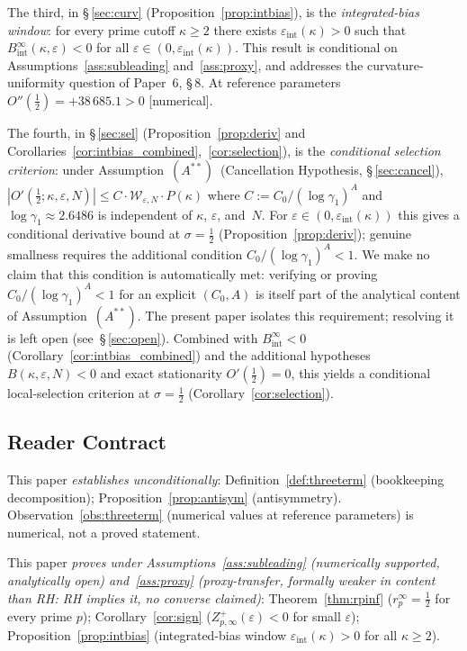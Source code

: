 \documentclass[11pt]{article}
\newcommand{\Wgamma}{\mathcal{W}_{\varepsilon,N}}   %
\newcommand{\Astar}{\ensuremath{(A^{**})}}  %
\begin{document}
The third, in \S\,\ref{sec:curv} (Proposition~\ref{prop:intbias}), is
the \emph{integrated-bias window}: for every prime cutoff $\kappa\ge 2$
there exists $\varepsilon_{\mathrm{int}}(\kappa)>0$ such that
$B_{\mathrm{int}}^\infty(\kappa,\varepsilon)<0$ for all
$\varepsilon\in(0,\varepsilon_{\mathrm{int}}(\kappa))$.
This result is conditional on Assumptions~\ref{ass:subleading}
and~\ref{ass:proxy}, and addresses the curvature-uniformity question
of Paper~6, \S\,8.
At reference parameters $O''(\tfrac12)=+38\,685.1>0$ [numerical].

The fourth, in \S\,\ref{sec:sel} (Proposition~\ref{prop:deriv} and
Corollaries~\ref{cor:intbias_combined},~\ref{cor:selection}), is the
\emph{conditional selection criterion}: under Assumption~\Astar\
(Cancellation Hypothesis, \S\,\ref{sec:cancel}),
$|O'(\tfrac12;\kappa,\varepsilon,N)|\le C\cdot\Wgamma\cdot P(\kappa)$
where $C:=C_0/(\log\gamma_1)^A$
and $\log\gamma_1\approx 2.6486$ is independent of $\kappa$, $\varepsilon$, and~$N$.
For $\varepsilon\in(0,\varepsilon_{\mathrm{int}}(\kappa))$ this gives a
conditional derivative bound at $\sigma=\tfrac12$
(Proposition~\ref{prop:deriv}); genuine smallness
requires the additional condition $C_0/(\log\gamma_1)^A<1$.
We make no claim that this condition is automatically met:
verifying or proving $C_0/(\log\gamma_1)^A<1$ for an explicit
$(C_0,A)$ is itself part of the analytical content of
Assumption~\Astar.
The present paper isolates this requirement; resolving it is left
open (see~\S\,\ref{sec:open}).
Combined with $B_{\mathrm{int}}^\infty<0$
(Corollary~\ref{cor:intbias_combined}) and the additional hypotheses
$B(\kappa,\varepsilon,N)<0$ and exact stationarity $O'(\tfrac12)=0$,
this yields a conditional local-selection criterion at
$\sigma=\tfrac12$ (Corollary~\ref{cor:selection}).

\subsection{Reader Contract}

This paper \emph{establishes unconditionally}:
Definition~\ref{def:threeterm} (bookkeeping decomposition);
Proposition~\ref{prop:antisym} (antisymmetry).
Observation~\ref{obs:threeterm} (numerical values at reference parameters)
is numerical, not a proved statement.

This paper \emph{proves under
Assumptions~\ref{ass:subleading} (numerically supported, analytically open)
and~\ref{ass:proxy} (proxy-transfer, formally weaker in content
than RH: RH implies it, no converse claimed)}:
Theorem~\ref{thm:rpinf} ($r_p^\infty=\tfrac12$ for every prime $p$);
Corollary~\ref{cor:sign} ($Z_{p,\infty}^+(\varepsilon)<0$ for small $\varepsilon$);
Proposition~\ref{prop:intbias}
(integrated-bias window $\varepsilon_{\mathrm{int}}(\kappa)>0$ for all $\kappa\ge 2$).
\end{document}
